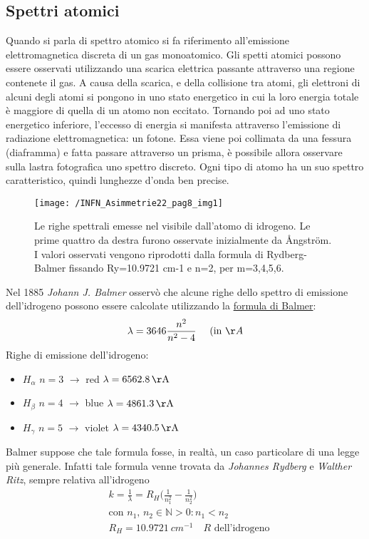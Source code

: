 \subsection{Spettri atomici} 
Quando si parla di spettro atomico si fa riferimento all'emissione elettromagnetica discreta di un gas monoatomico.
Gli spetti atomici possono essere osservati utilizzando una scarica elettrica passante attraverso una regione contenete il gas.
A causa della scarica, e della collisione tra atomi, gli elettroni di alcuni degli atomi si pongono in uno stato energetico in cui la loro energia totale è maggiore di quella di un atomo non eccitato.
Tornando poi ad uno stato energetico inferiore, l'eccesso di energia si manifesta attraverso l'emissione di radiazione elettromagnetica: un fotone.
Essa viene poi collimata da una fessura (diaframma) e fatta passare attraverso un prisma, è possibile allora osservare sulla lastra fotografica uno spettro discreto.
Ogni tipo di atomo ha un suo spettro caratteristico, quindi lunghezze d'onda ben precise.
\begin{figure}[h]
\centering
\texttt{[image: /INFN\_Asimmetrie22\_pag8\_img1]}
\caption{ Le righe spettrali emesse nel visibile dall’atomo di idrogeno. Le prime quattro da destra furono osservate inizialmente da Ångström. I valori osservati vengono riprodotti dalla formula di Rydberg-Balmer fissando Ry=10.9721 cm-1 e n=2, per m=3,4,5,6. }
\end{figure}
Nel 1885 \textit{Johann J. Balmer} osservò che alcune righe dello spettro di emissione dell'idrogeno possono essere calcolate utilizzando la \underline{formula di Balmer}:
\begin{equation}
\lambda = 3646 \frac{n^2}{n^2 - 4} \quad \mbox{ (in $\AA$}
\end{equation}
Righe di emissione dell'idrogeno:
\begin{itemize}
\item $H_{\alpha}$ $n=3$ $\rightarrow$ red $\lambda = \SI{6562.8}{\AA}$
\item $H_{\beta}$ $n=4$ $\rightarrow$ blue $\lambda = \SI{4861.3}{\AA}$
\item $H_{\gamma}$ $n=5$ $\rightarrow$ violet $\lambda = \SI{4340.5}{\AA}$
\end{itemize}
Balmer suppose che tale formula fosse, in realtà, un caso particolare di una legge più generale.
Infatti tale formula venne trovata da \textit{Johannes Rydberg} e \textit{Walther Ritz}, sempre relativa all'idrogeno
\begin{equation}
\begin{split}
& k = \frac{1}{\lambda} = R_H \biggl( \frac{1}{n_1^2} - \frac{1}{n_2^2}  \biggr) \\
& \mbox{con } n_{1} \mbox{, } n_{2} \in \mathbb{N} > 0 : n_{1} < n_{2} \\
& R_H = \SI{10.9721}{cm^{-1}} \quad R \mbox{ dell'idrogeno}
\end{split}
\end{equation}
